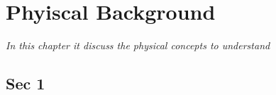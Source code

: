 \chapter{Phyiscal Background }
\label{chapter:Introduction}
\textit{In this chapter it discuss the physical concepts to understand }
\vfill
\minitoc\newpage


\section{Sec 1}

